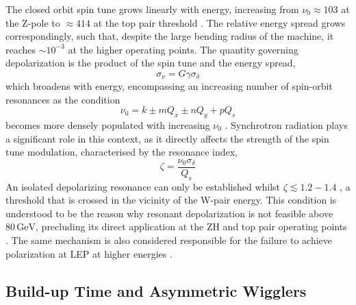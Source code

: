 \documentclass[%
 aip,
 amsmath,amssymb,
 reprint,%
superscriptaddress
]{revtex4-2}
\begin{document}
The closed orbit spin tune grows linearly with energy, increasing from $\nu_0 \approx 103$ at the Z-pole to $\approx 414$ at the top pair threshold \cite{blondel_polarization_2019}.
The relative energy spread grows correspondingly, such that, despite the large bending radius of the machine, it reaches $\sim 10^{-3}$ at the higher operating points.
The quantity governing depolarization is the product of the spin tune and the energy spread,
\begin{equation}
  \sigma_\nu=G\gamma\sigma_\delta
\end{equation}
which broadens with energy, encompassing an increasing number of spin-orbit resonances as the condition
\begin{equation}
  \nu_0= k\pm mQ_x\pm nQ_y +pQ_s
\end{equation}
becomes more densely populated with increasing $\nu_0$ \cite{assmann_spin_2001}.
Synchrotron radiation plays a significant role in this context, as it directly affects the strength of the spin tune modulation, characterised by the resonance index,
\begin{equation}
  \zeta=\frac{\nu_0 \sigma_\delta}{Q_s}
\end{equation}
An isolated depolarizing resonance can only be established whilst $\zeta \lesssim 1.2-1.4$ \cite{keintzel_wu_kiel_sagan_wilkinson_oide_bauche_hofle_blondel_jiang_2025}, a threshold that is crossed in the vicinity of the W-pair energy.
This condition is understood to be the reason why resonant depolarization is not feasible above $80\,\text{GeV}$, precluding its direct application at the ZH and top pair operating points \cite{blondel_polarization_2019,keintzel_wu_kiel_sagan_wilkinson_oide_bauche_hofle_blondel_jiang_2025}.
The same mechanism is also considered responsible for the failure to achieve polarization at LEP at higher energies \cite{assmann_spin_2001}.

\subsection{Build-up Time and Asymmetric Wigglers}
\end{document}
